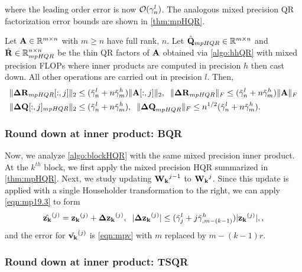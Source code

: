 where the leading order error is now $\mathcal{O}(\gamma_n^l)$.
The analogous mixed precision QR factorization error bounds are shown in \cref{thm:mpHQR}.
\begin{theorem}
	\label{thm:mpHQR}
	Let $\mathbf{A}\in\mathbb{R}^{m\times n}$ with $m\geq n$ have full rank, $n$. 
	Let $\hat{\mathbf{Q}}_{mpHQR}\in\mathbb{R}^{m\times n}$ and $\hat{\mathbf{R}}\in\mathbb{R}^{n\times n}_{mpHQR}$ be the thin QR factors of $\mathbf{A}$ obtained via \cref{algo:hhQR} with mixed precision FLOPs where inner products are computed in precision $h$ then cast down.
	All other operations are carried out in precision $l$.
	Then,
	\begin{align*}
	\|\mathbf{\Delta R}_{mpHQR}[:,j]\|_2&\leq (\tilde{\gamma}_n^l+n\tilde{\gamma}_m^h) \|\mathbf{A}[:,j]\|_2,\;\; \|\mathbf{\Delta R}_{mpHQR}\|_F\leq (\tilde{\gamma}_n^l+n\tilde{\gamma}_m^h) \|\mathbf{A}\|_F\\
	\|\mathbf{\Delta Q}[:,j]_{mpHQR}\|_2&\leq (\tilde{\gamma}_n^l+n\tilde{\gamma}_m^h),\;\; \|\mathbf{\Delta Q}_{mpHQR}\|_F \leq n^{1/2} (\tilde{\gamma}_n^l+n\tilde{\gamma}_m^h).
	\end{align*}
\end{theorem}


\subsubsection{Round down at inner product: BQR}
Now, we analyze \cref{algo:blockHQR} with the same mixed precision inner product. 
At the $k^{th}$ block, we first apply the mixed precision HQR summarized in \cref{thm:mpHQR}.
Next, we study updating $\mathbf{W_k}^{j-1}$ to $\mathbf{W_k}^{j}$.
Since this update is applied with a single Householder transformation to the right, we can apply \cref{eqn:mp19.3} to form 
\begin{equation}
	\hat{\bb{z_k}}^{(j)}= \bb{z_k}^{(j)} + \bb{\Delta z_k}^{(j)},\;\; |\bb{\Delta z_k}^{(j)}| \leq(\tilde{\gamma}_j^l+j\tilde{\gamma}_{,m-(k-1)}^h)  |\bb{z_k}^{(j)}|\label{eqn:mpBQR-z},,
\end{equation}
and the error for $\hat{\mathbf{v_k}}^{(j)}$ is \cref{eqn:mpv} with $m$ replaced by $m-(k-1)r$.


\subsubsection{Round down at inner product: TSQR}
